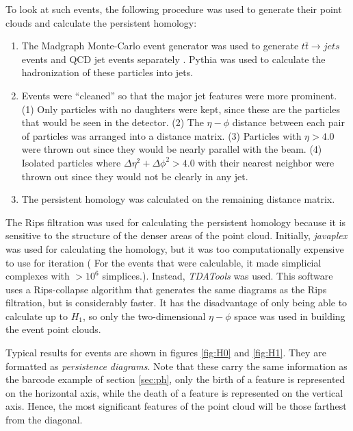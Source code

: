 \documentclass[a4paper,12pt]{report}
\begin{document}
To look at such events, the following procedure was used to generate their point clouds and calculate the persistent homology:
\begin{enumerate}
 \item The Madgraph Monte-Carlo event generator was used to generate $t\bar{t}\rightarrow jets$ events and QCD jet events separately \cite{madgraph:2011}. Pythia \cite{Pythia:2006} was used to calculate the hadronization of these particles into jets. 
 \item Events were ``cleaned'' so that the major jet features were more prominent. (1) Only particles with no daughters were kept, since these are the particles that would be seen in the detector. (2) The $\eta-\phi$ distance between each pair of particles was arranged into a distance matrix. (3) Particles with $\eta > 4.0$ were thrown out since they would be nearly parallel with the beam. (4) Isolated particles where $\Delta\eta^2+\Delta\phi^2 > 4.0$ with their nearest neighbor were thrown out since they would not be clearly in any jet.
 \item The persistent homology was calculated on the remaining distance matrix. 
\end{enumerate}

The Rips filtration was used for calculating the persistent homology because it is sensitive to the structure of the denser areas of the point cloud. Initially, \textit{javaplex} \cite{Javaplex} was used for calculating the homology, but it was too computationally expensive to use for iteration ( For the events that were calculable, it made simplicial complexes with $>10^6$ simplices.). Instead, \textit{TDATools} \cite{TDA} was used. This software uses a Rips-collapse algorithm that generates the same diagrams as the Rips filtration, but is considerably faster. It has the disadvantage of only being able to calculate up to $H_1$, so only the two-dimensional $\eta-\phi$ space was used in building the event point clouds.


Typical results for events are shown in figures \ref{fig:H0} and \ref{fig:H1}. They are formatted as \textit{persistence diagrams}. Note that these carry the same information as the barcode example of section \ref{sec:ph}, only the birth of a feature is represented on the horizontal axis, while the death of a feature is represented on the vertical axis. Hence, the most significant features of the point cloud will be those farthest from the diagonal.
\end{document}
